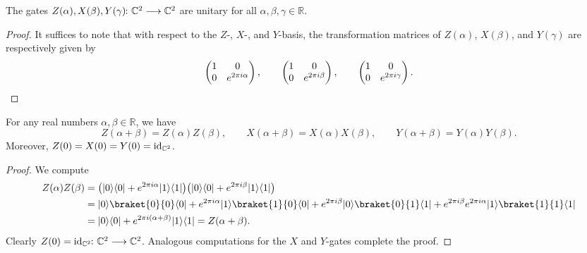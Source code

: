 \documentclass[a4paper, oneside, 12pt]{amsart}
\begin{document}
\begin{lemma}\label{lem:xyz-gates-are-unitary}
  The gates \(Z(\alpha), X(\beta), Y(\gamma) \from \mathbb{C}^{2} \to \mathbb{C}^{2}\) are unitary for all \(\alpha,\beta, \gamma \in \mathbb{R}\).
\end{lemma}
\begin{proof}
  It suffices to note that with respect to the \(Z\)-, \(X\)-, and \(Y\)-basis, the transformation matrices of \(Z(\alpha)\), \(X(\beta)\), and \(Y(\gamma)\) are respectively given by
  \begin{equation*}
    \begin{pmatrix}
      1 & 0 \\
      0 & e^{2\pi i \alpha}
    \end{pmatrix}, \qquad
    \begin{pmatrix}
      1 & 0 \\
      0 & e^{2\pi i \beta}
    \end{pmatrix},\qquad
    \begin{pmatrix}
      1 & 0 \\
      0 & e^{2\pi i \gamma}
    \end{pmatrix}. \qedhere
  \end{equation*}
\end{proof}

\begin{lemma}\label{lem:additivity-of-z-x-y-gates}
  For any real numbers \(\alpha, \beta \in \mathbb{R}\), we have
  \begin{equation}\label{eq:additivity-of-z-x-y-gates}
    Z(\alpha+\beta) = Z(\alpha)Z(\beta), \qquad
    X(\alpha+\beta) = X(\alpha)X(\beta), \qquad
    Y(\alpha+\beta) = Y(\alpha)Y(\beta).
  \end{equation}
  Moreover, \(Z(0) = X(0) = Y(0) = \mathrm{id}_{ \mathbb{C}^{2}}\).
\end{lemma}
\begin{proof}
  We compute
  \begin{align*}
    Z(\alpha)Z(\beta)
    & =
      \big(\ket{0}\bra{0} + e^{2\pi i \alpha}\ket{1}\bra{1} \big)
      \big(\ket{0}\bra{0} + e^{2\pi i \beta}\ket{1}\bra{1} \big) \\
    & =
      \ket{0}\braket{0}{0}\bra{0} + e^{2\pi i \alpha}\ket{1}\braket{1}{0}\bra{0} +
      e^{2\pi i \beta} \ket{0}\braket{0}{1}\bra{1} +
      e^{2\pi i \beta}e^{2\pi i \alpha}\ket{1}\braket{1}{1}\bra{1} \\
    & = \ket{0}\bra{0} + e^{2 \pi i (\alpha + \beta)} \ket{1}\bra{1}
      = Z(\alpha + \beta).
  \end{align*}
  Clearly \(Z(0) = \id_{ \mathbb{C}^{2}} \from \mathbb{C}^{2} \to \mathbb{C}^{2}\).
  Analogous computations for the \(X\) and \(Y\)-gates complete the proof.
\end{proof}
\end{document}
